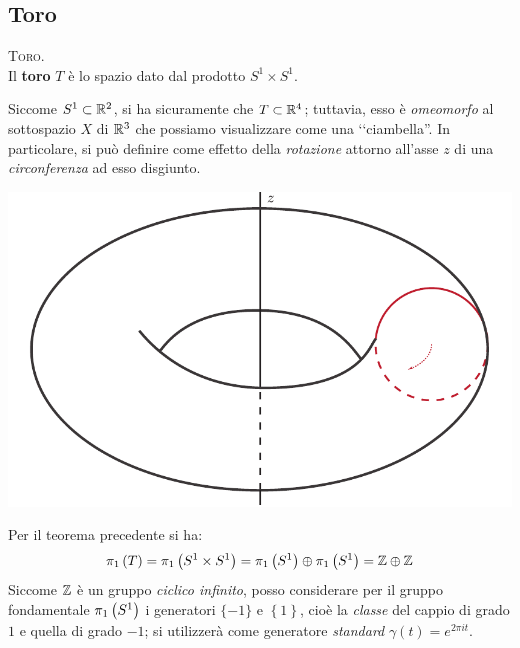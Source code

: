 \subsection{Toro}
\begin{define}\textsc{Toro.}\\ \label{ciambella}
	Il \textbf{toro} $T$ è lo spazio dato dal prodotto $S^1\times S^1$.
\end{define}
	Siccome $S^1\subset\mathbb{R}^2$, si ha sicuramente che $T\subset \mathbb{R}^4$; tuttavia, esso è \textit{omeomorfo} al sottospazio $X$ di $\mathbb{R}^3$ che possiamo visualizzare come una ‘‘ciambella''.
	In particolare, si può definire come effetto della \textit{rotazione} attorno all'asse $z$ di una \textit{circonferenza} ad esso disgiunto.\\
	\begin{minipage}{.42\linewidth}
		\begin{center}
				\includegraphics[trim=0cm 0cm 0cm 0cm,clip,scale=0.45]{images/torusalone.pdf}
		\end{center}

	\end{minipage}
	\begin{minipage}{.57\linewidth}
	Per il teorema precedente si ha: 
\begin{equation*}
	\gruf{T}{\ }=\gruf{S^1\times S^1}{\ }=\gruf{S^1}{\ }\oplus\gruf{S^1}{\ }=\integerset\oplus\integerset
\end{equation*}
Siccome $\mathbb{Z}$ è un gruppo \textit{ciclico infinito}, posso considerare per il gruppo fondamentale $\gruf{S^1}{\ }$ i generatori $\{-1\}$ e $\left\{1\right\}$, cioè la \textit{classe} del cappio di grado $1$ e quella di grado $-1$; si utilizzerà come generatore \textit{standard} $\gamma(t)=e^{2\pi i t}$.
	\end{minipage}\\
